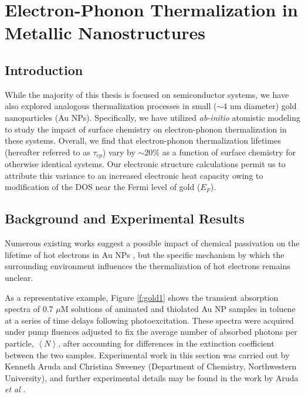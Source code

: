 \section{Electron-Phonon Thermalization in Metallic Nanostructures}
\subsection{Introduction}
While the majority of this thesis is focused on semiconductor systems, we have also explored analogous thermalization processes in small ($\sim$4 nm diameter) gold nanoparticles (Au NPs).  Specifically, we have utilized \emph{ab-initio} atomistic modeling to study the impact of surface chemistry on electron-phonon thermalization in these systems. Overall, we find that electron-phonon thermalization lifetimes (hereafter referred to as $\tau_{ep}$) vary by $\sim$20\% as a function of surface chemistry for otherwise identical systems. Our electronic structure calculations permit us to attribute this variance to an increased electronic heat capacity owing to modification of the DOS near the Fermi level of gold ($E_F$).  

\subsection{Background and Experimental Results}
Numerous existing works suggest a possible impact of chemical passivation on the lifetime of hot electrons in Au NPs \cite{westcott2001adsorbate,hu2002heat,huang2007effect,link2002hot,shin2003comparative}, but the specific mechanism by which the surrounding environment influences the thermalization of hot electrons remains unclear. \par

As a representative example, Figure \ref{f:gold1} shows the transient absorption spectra of 0.7 $\mu$M solutions of aminated and thiolated Au NP samples in toluene at a series of time delays following photoexcitation. These spectra were acquired under pump fluences adjusted to fix the average number of absorbed photons per particle, $\left\langle N\right\rangle$, after accounting for differences in the extinction coefficient between the two samples. Experimental work in this section was carried out by Kenneth Aruda and Christina Sweeney (Department of Chemistry, Northwestern University), and further experimental details may be found in the work by Aruda \emph{et al} \cite{aruda2013identification}. \par

